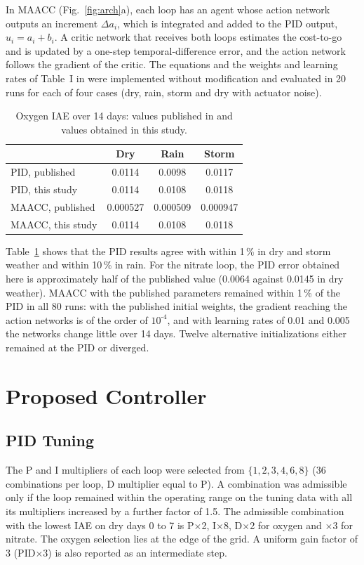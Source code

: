 \documentclass[journal]{IEEEtran}
\newcommand{\hy}{\text{-}}
\begin{document}
In MAACC (Fig.~\ref{fig:arch}a), each loop has an agent whose action network
outputs an increment $\Delta a_i$, which is integrated and added to the PID
output, $u_i=a_i+b_i$. A critic network that receives both loops estimates
the cost-to-go and is updated by a one-step temporal-difference error, and
the action network follows the gradient of the critic. The equations and
the weights and learning rates of Table~I in \cite{wang2026maacc} were
implemented without modification and evaluated in 20 runs for each of four
cases (dry, rain, storm and dry with actuator noise).

\begin{table}[!t]
\centering
\caption{Oxygen IAE over 14 days: values published in \cite{wang2026maacc}
and values obtained in this study.}
\label{tab:repro}
\begin{tabular}{lccc}
\toprule
 & Dry & Rain & Storm\\
\midrule
PID, published & 0.0114 & 0.0098 & 0.0117\\
PID, this study & 0.0114 & 0.0108 & 0.0118\\
MAACC, published & 0.000527 & 0.000509 & 0.000947\\
MAACC, this study & 0.0114 & 0.0108 & 0.0118\\
\bottomrule
\end{tabular}
\end{table}

Table~\ref{tab:repro} shows that the PID results agree with
\cite{wang2026maacc} within 1\,\% in dry and storm weather and within
10\,\% in rain. For the nitrate loop, the PID error obtained here is
approximately half of the published value (0.0064 against 0.0145 in dry
weather). MAACC with the published parameters remained within 1\,\% of the
PID in all 80 runs: with the published initial weights, the gradient
reaching the action networks is of the order of $10^{\hy4}$, and with learning
rates of 0.01 and 0.005 the networks change little over 14 days. Twelve
alternative initializations either remained at the PID or diverged.

\section{Proposed Controller}
\label{sec:prop}

\subsection{PID Tuning}
The P and I multipliers of each loop were selected from
$\{1,2,3,4,6,8\}$ (36 combinations per loop, D multiplier equal to P). A
combination was admissible only if the loop remained within the operating
range on the tuning data with all its multipliers increased by a further
factor of 1.5. The admissible combination with the lowest IAE on dry days 0
to 7 is P$\times$2, I$\times$8, D$\times$2 for oxygen and $\times3$ for
nitrate. The oxygen selection lies at the edge of the grid. A uniform gain
factor of 3 (PID$\times$3) is also reported as an intermediate step.
\end{document}
